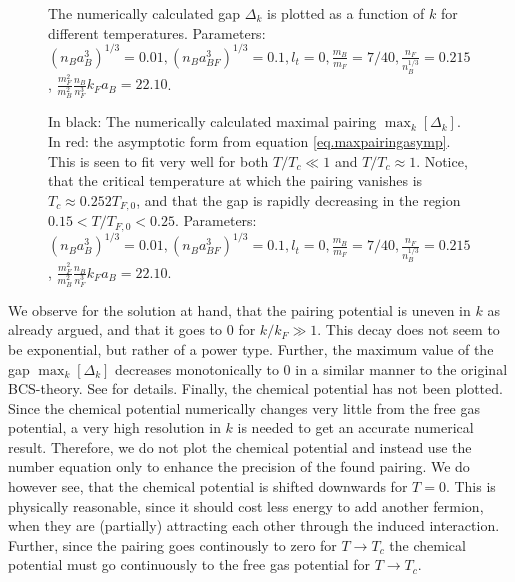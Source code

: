 \begin{figure} 
\begin{center}  
  
\caption{The numerically calculated gap $\Delta_k$ is plotted as a function of $k$ for different temperatures. Parameters: $(n_Ba_B^3)^{1/3} = 0.01, (n_Ba_{BF}^3)^{1/3} = 0.1, l_t = 0, \frac{m_B}{m_F} = 7/40, \frac{n_F}{n_B^{1/3}} = 0.215$, $\frac{m_F^2}{m_B^2}\frac{n_B}{n_F^3} k_Fa_B = 22.10$. }  
\label{fig.Deltakkdepend}  
\end{center}    
\end{figure}

\begin{figure} 
\begin{center}  
  
\caption{In black: The numerically calculated maximal pairing $\max_k[\Delta_k]$. In red: the asymptotic form from equation \eqref{eq.maxpairingasymp}. This is seen to fit very well for both $T/T_c \ll 1$ and $T/T_c \approx 1$. Notice, that the critical temperature at which the pairing vanishes is $T_c \approx 0.252 T_{F,0}$, and that the gap is rapidly decreasing in the region $0.15< T/T_{F,0} < 0.25$. Parameters: $(n_Ba_B^3)^{1/3} = 0.01, (n_Ba_{BF}^3)^{1/3} = 0.1, l_t = 0, \frac{m_B}{m_F} = 7/40, \frac{n_F}{n_B^{1/3}} = 0.215$, $\frac{m_F^2}{m_B^2}\frac{n_B}{n_F^3} k_Fa_B = 22.10$. }  
\label{fig.maxkDeltakTdepend}  
\end{center}    
\end{figure}

We observe for the solution at hand, that the pairing potential is uneven in $k$ as already argued, and that it goes to 0 for $k/k_F \gg 1$. This decay does not seem to be exponential, but rather of a power type. Further, the maximum value of the gap $\max_k[\Delta_k]$ decreases monotonically to 0 in a similar manner to the original BCS-theory. See \cite{Tinkham,BruusFlensberg,PlischkeStatPhys} for details. Finally, the chemical potential has not been plotted. Since the chemical potential numerically changes very little from the free gas potential, a very high resolution in $k$ is needed to get an accurate numerical result. Therefore, we do not plot the chemical potential and instead use the number equation only to enhance the precision of the found pairing. We do however see, that the chemical potential is shifted downwards for $T = 0$. This is physically reasonable, since it should cost less energy to add another fermion, when they are (partially) attracting each other through the induced interaction. Further, since the pairing goes continously to zero for $T\to T_c$ the chemical potential must go continuously to the free gas potential for $T\to T_c$. 


